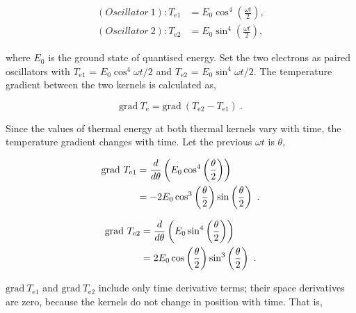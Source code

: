 \documentclass[%
 reprint,
 amsmath,amssymb,
 aps,
]{revtex4-1}
\numberwithin{equation}{section}%
\begin{document}
        \begin{equation}
            \begin{split}
                (Oscillator \ 1): T_{\mathrm{e1}}
                    &= E_{0} \cos^{4} \left( \frac{\omega t}{2} \right) , \\
                (Oscillator \ 2): T_{\mathrm{e2}}
                    &= E_{0} \sin^{4} \left( \frac{\omega t}{2} \right)
                    ,
            \label{e3_Oscillators_Te1_Te2}
            \end{split}
        \end{equation}


    \noindent where $E_{0}$ is the ground state of quantised energy. Set the two electrons as paired oscillators with $T_{\mathrm{e1}}$ = $E_{0} \cos^{4} \omega t /2$ and $T_{\mathrm{e2}}$ = $E_{0} \sin^{4} \omega t /2$. The temperature gradient between the two kernels is calculated as,

    \begin{equation}
            \mathrm{grad} \ T_{\mathrm{e}} = \mathrm{grad} \ ( T_{\mathrm{e2}} - T_{\mathrm{e1}} )
            \ .
            \label{e3_k_grad_Te2-Te1}
    \end{equation}

    Since the values of thermal energy at both thermal kernels vary with time, the temperature gradient changes with time. Let the previous $\omega t$ is $\theta$,

        \begin{align}
            \mathrm{grad} \ T_{\mathrm{e1}}
                &= \frac{d}{d \theta} \left( E_{0} \cos^{4} \left( \frac{\theta}{2} \right) \right) \notag \\
                &= - 2 E_{0} \cos^{3} \left( \frac{\theta}{2} \right) \sin \left( \frac{\theta}{2} \right)
                \ .
                \label{e3_gradT_e1}
        \end{align}

        \begin{align}
            \mathrm{grad} \ T_{\mathrm{e2}}
                &= \frac{d}{d \theta} \left( E_{0} \sin^{4} \left( \frac{\theta}{2} \right) \right) \notag \\
                &=   2 E_{0} \cos \left( \frac{\theta}{2} \right) \sin^{3} \left( \frac{\theta}{2} \right)
                \ .
                \label{e3_gradT_e2}
        \end{align}        

$\mathrm{grad} \ T_{\mathrm{e1}}$ and $\mathrm{grad} \ T_{\mathrm{e2}}$ include only time derivative terms; their space derivatives are zero, because the kernels do not change in position with time. That is,
\end{document}
